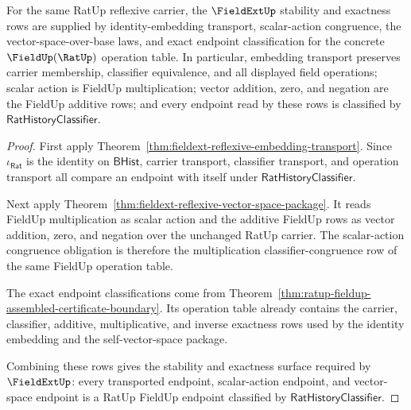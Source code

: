 \begin{theorem}
\label{thm:fieldext-reflexive-stability-exactness-obligations}
For the same RatUp reflexive carrier, the $\FieldExtUp$ stability and exactness
rows are supplied by identity-embedding transport, scalar-action congruence,
the vector-space-over-base laws, and exact endpoint classification for the
concrete $\FieldUp(\RatUp)$ operation table. In particular, embedding transport
preserves carrier membership, classifier equivalence, and all displayed field
operations; scalar action is FieldUp multiplication; vector addition, zero, and
negation are the FieldUp additive rows; and every endpoint read by these rows is
classified by $\mathsf{RatHistoryClassifier}$.
\end{theorem}
\begin{proof}
First apply Theorem~\ref{thm:fieldext-reflexive-embedding-transport}. Since
$\iota_{\mathsf{Rat}}$ is the identity on $\mathsf{BHist}$, carrier transport,
classifier transport, and operation transport all compare an endpoint with
itself under $\mathsf{RatHistoryClassifier}$.

Next apply Theorem~\ref{thm:fieldext-reflexive-vector-space-package}. It reads
FieldUp multiplication as scalar action and the additive FieldUp rows as vector
addition, zero, and negation over the unchanged RatUp carrier. The
scalar-action congruence obligation is therefore the multiplication
classifier-congruence row of the same FieldUp operation table.

The exact endpoint classifications come from
Theorem~\ref{thm:ratup-fieldup-assembled-certificate-boundary}. Its operation
table already contains the carrier, classifier, additive, multiplicative, and
inverse exactness rows used by the identity embedding and the self-vector-space
package.

Combining these rows gives the stability and exactness surface required by
$\FieldExtUp$: every transported endpoint, scalar-action endpoint, and
vector-space endpoint is a RatUp FieldUp endpoint classified by
$\mathsf{RatHistoryClassifier}$.
\end{proof}

